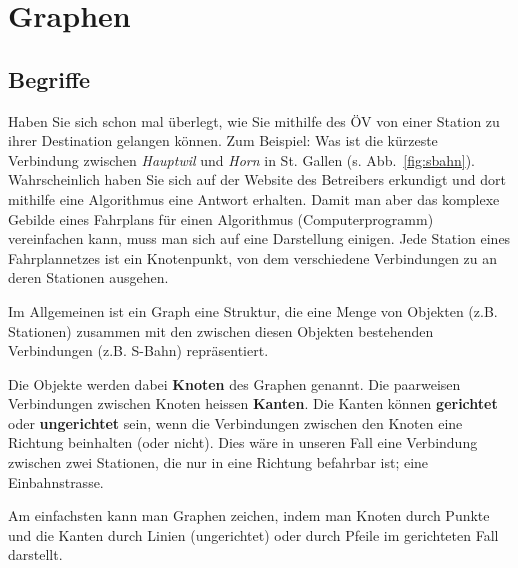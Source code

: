 \section{Graphen}




\subsection{Begriffe}

Haben Sie sich schon mal überlegt, wie Sie mithilfe des ÖV von einer Station zu ihrer Destination gelangen können. 
Zum Beispiel: Was ist die kürzeste Verbindung zwischen \emph{Hauptwil} und \emph{Horn} in St. Gallen (s. Abb.~\ref{fig:sbahn}). 
Wahrscheinlich haben Sie sich auf der Website des Betreibers erkundigt und dort mithilfe eine Algorithmus eine Antwort erhalten. 
Damit man aber das komplexe Gebilde eines Fahrplans für einen Algorithmus (Computerprogramm) vereinfachen kann, muss man sich auf eine Darstellung einigen. 
Jede Station eines Fahrplannetzes ist ein Knotenpunkt, von dem verschiedene Verbindungen zu  
an deren Stationen ausgehen. 

Im Allgemeinen ist ein Graph eine Struktur, die eine Menge von Objekten (z.B. Stationen) zusammen mit den zwischen diesen Objekten bestehenden Verbindungen (z.B. S-Bahn) repräsentiert. 

Die Objekte werden dabei \textbf{Knoten} des Graphen genannt. 
Die paarweisen Verbindungen zwischen Knoten heissen \textbf{Kanten}. 
Die Kanten können \textbf{gerichtet} oder \textbf{ungerichtet} sein, wenn die Verbindungen zwischen den Knoten eine Richtung beinhalten (oder nicht).
Dies wäre in unseren Fall eine Verbindung zwischen zwei Stationen, die nur in eine Richtung befahrbar ist; eine Einbahnstrasse.

Am einfachsten kann man Graphen zeichen, indem man Knoten durch Punkte und die Kanten durch Linien (ungerichtet) oder durch Pfeile im gerichteten Fall darstellt. 

